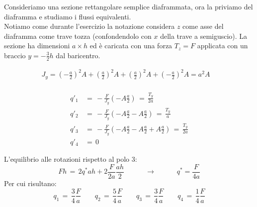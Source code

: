 \begin{esempioBox}
    Consideriamo una sezione rettangolare semplice diaframmata, ora la priviamo del diaframma e studiamo i flussi equivalenti.\\
    Notiamo come durante l'esercizio la notazione considera $z$ come asse del diaframma come trave tozza (confondendolo con $x$ della trave a semiguscio).
    La sezione ha dimensioni $a\times h$ ed è caricata con una forza $T_z=F$ applicata con un braccio $y=-\frac{3}{2}h$ dal baricentro.

    \begin{align*}
        J_y = \left(-\frac{a}{2}\right)^2A +\left(\frac{a}{2}\right)^2A+ \left(\frac{a}{2}\right)^2A +\left(-\frac{a}{2}\right)^2A = a^2A\quad\\
    \end{align*}

    \begin{align*}
         q'_1 \,&= \,  -\frac{F}{J_y}\left( -A\frac{a}{2} \right) \,=\, \frac{T_y}{2a}\\
          q'_2 \,&= \, -\frac{F}{J_y}\left( -A\frac{a}{2}-A\frac{a}{2} \right) \,=\, \frac{T_y}{a}\\
           q'_3 \,&= \,  -\frac{F}{J_y}\left( -A\frac{a}{2}-A\frac{a}{2}+A\frac{a}{2} \right) \,=\, \frac{T_y}{2a}\\
            q'_4 \,&= \, 0
    \end{align*}

    L'equilibrio alle rotazioni rispetto al polo 3:
    \begin{equation*}
        Fh\,=\,2q^*ah+2\frac{F}{2a}\frac{ah}{2}   \quad\quad\quad\rightarrow\quad\quad\quad q^*=\frac{F}{4a}
    \end{equation*}
    Per cui risultano:
    \begin{equation*}
        q_1 \,=\, \frac{3}{4}\frac{F}{a} \quad \quad  
         q_2 \,=\, \frac{5}{4}\frac{F}{a} \quad \quad  
          q_3 \,=\, \frac{3}{4}\frac{F}{a} \quad \quad  
           q_4 \,=\, \frac{1}{4}\frac{F}{a} 
    \end{equation*}


\end{esempioBox}
